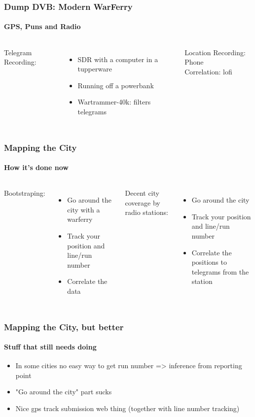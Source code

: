 \begin{frame}
  \frametitle{Dump DVB: Modern WarFerry}
  \framesubtitle{GPS, Puns and Radio}
  \begin{columns}
      Telegram Recording:
        \begin{itemize}
      \item SDR with a computer in a tupperware
      \item Running off a powerbank
      \item Wartrammer-40k: filters telegrams
    \end{itemize}
      Location Recording: Phone\\
      Correlation: lofi
  \end{columns}
\end{frame}

\begin{frame}
  \frametitle{Mapping the City}
  \framesubtitle{How it's done now}
  \begin{columns}
    Bootstraping:
    \begin{itemize}
      \item Go around the city with a warferry
      \item Track your position and line/run number
      \item Correlate the data
    \end{itemize}
    Decent city coverage by radio stations:
    \begin{itemize}
      \item Go around the city
      \item Track your position and line/run number
      \item Correlate the positions to telegrams from the station
    \end{itemize}
  \end{columns}
\end{frame}

\begin{frame}
  \frametitle{Mapping the City, but better}
  \framesubtitle{Stuff that still needs doing}
  \begin{itemize}
    \item In some cities no easy way to get run number => inference from reporting point
    \item "Go around the city" part sucks
    \item Nice gps track submission web thing (together with line number tracking)
  \end{itemize}
\end{frame}
